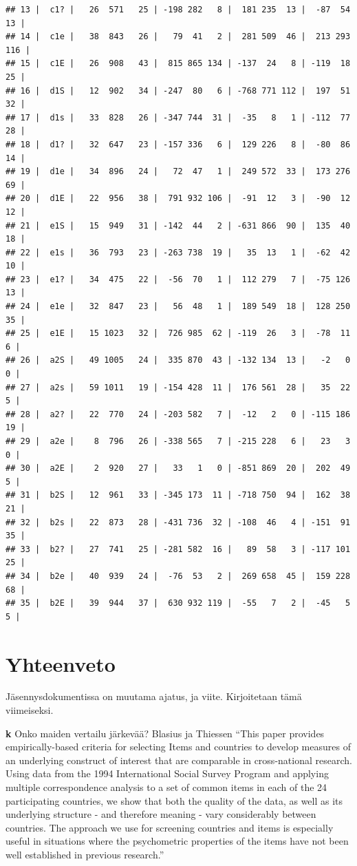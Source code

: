\documentclass[
  finnish,
]{book}
\begin{document}
\begin{verbatim}
## 13 |  c1? |   26  571   25 | -198 282   8 |  181 235  13 |  -87  54  13 |
## 14 |  c1e |   38  843   26 |   79  41   2 |  281 509  46 |  213 293 116 |
## 15 |  c1E |   26  908   43 |  815 865 134 | -137  24   8 | -119  18  25 |
## 16 |  d1S |   12  902   34 | -247  80   6 | -768 771 112 |  197  51  32 |
## 17 |  d1s |   33  828   26 | -347 744  31 |  -35   8   1 | -112  77  28 |
## 18 |  d1? |   32  647   23 | -157 336   6 |  129 226   8 |  -80  86  14 |
## 19 |  d1e |   34  896   24 |   72  47   1 |  249 572  33 |  173 276  69 |
## 20 |  d1E |   22  956   38 |  791 932 106 |  -91  12   3 |  -90  12  12 |
## 21 |  e1S |   15  949   31 | -142  44   2 | -631 866  90 |  135  40  18 |
## 22 |  e1s |   36  793   23 | -263 738  19 |   35  13   1 |  -62  42  10 |
## 23 |  e1? |   34  475   22 |  -56  70   1 |  112 279   7 |  -75 126  13 |
## 24 |  e1e |   32  847   23 |   56  48   1 |  189 549  18 |  128 250  35 |
## 25 |  e1E |   15 1023   32 |  726 985  62 | -119  26   3 |  -78  11   6 |
## 26 |  a2S |   49 1005   24 |  335 870  43 | -132 134  13 |   -2   0   0 |
## 27 |  a2s |   59 1011   19 | -154 428  11 |  176 561  28 |   35  22   5 |
## 28 |  a2? |   22  770   24 | -203 582   7 |  -12   2   0 | -115 186  19 |
## 29 |  a2e |    8  796   26 | -338 565   7 | -215 228   6 |   23   3   0 |
## 30 |  a2E |    2  920   27 |   33   1   0 | -851 869  20 |  202  49   5 |
## 31 |  b2S |   12  961   33 | -345 173  11 | -718 750  94 |  162  38  21 |
## 32 |  b2s |   22  873   28 | -431 736  32 | -108  46   4 | -151  91  35 |
## 33 |  b2? |   27  741   25 | -281 582  16 |   89  58   3 | -117 101  25 |
## 34 |  b2e |   40  939   24 |  -76  53   2 |  269 658  45 |  159 228  68 |
## 35 |  b2E |   39  944   37 |  630 932 119 |  -55   7   2 |  -45   5   5 |
\end{verbatim}

\hypertarget{yhteenveto}{%
\chapter{Yhteenveto}\label{yhteenveto}}

Jäsennysdokumentissa on muutama ajatus, ja viite. Kirjoitetaan tämä viimeiseksi.

\textbf{k} Onko maiden vertailu järkevää?
Blasius ja Thiessen
``This paper provides empirically-based criteria for selecting Items and countries
to develop measures of an underlying construct of interest that are comparable in
cross-national research. Using data from the 1994 International Social Survey
Program and applying multiple correspondence analysis to a set of common items
in each of the 24 participating countries, we show that both the quality of the
data, as well as its underlying structure - and therefore meaning - vary
considerably between countries. The approach we use for screening countries and
items is especially useful in situations where the psychometric properties of
the items have not been well established in previous research.''
\citep{RefWorks:doc:5b15542ee4b0e2616bc42dca}
\end{document}
